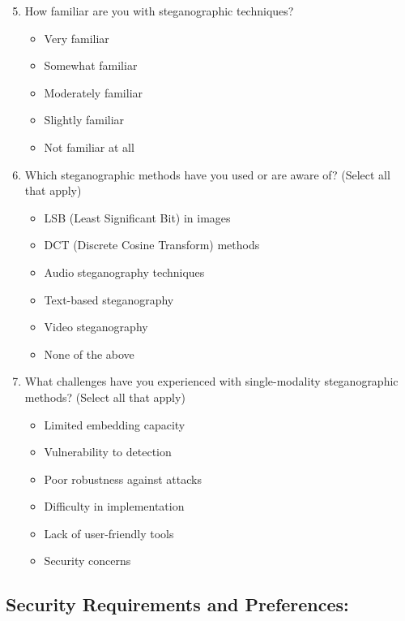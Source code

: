 \documentclass[12pt, a4paper, oneside]{book}
\begin{document}
\begin{enumerate}\setcounter{enumi}{4}
    \item How familiar are you with steganographic techniques?
    \begin{itemize}
        \item Very familiar
        \item Somewhat familiar
        \item Moderately familiar
        \item Slightly familiar
        \item Not familiar at all
    \end{itemize}

    \item Which steganographic methods have you used or are aware of? (Select all that apply)
    \begin{itemize}
        \item LSB (Least Significant Bit) in images
        \item DCT (Discrete Cosine Transform) methods
        \item Audio steganography techniques
        \item Text-based steganography
        \item Video steganography
        \item None of the above
    \end{itemize}

    \item What challenges have you experienced with single-modality steganographic methods? (Select all that apply)
    \begin{itemize}
        \item Limited embedding capacity
        \item Vulnerability to detection
        \item Poor robustness against attacks
        \item Difficulty in implementation
        \item Lack of user-friendly tools
        \item Security concerns
    \end{itemize}
\end{enumerate}

\subsection*{Security Requirements and Preferences:}
\end{document}
